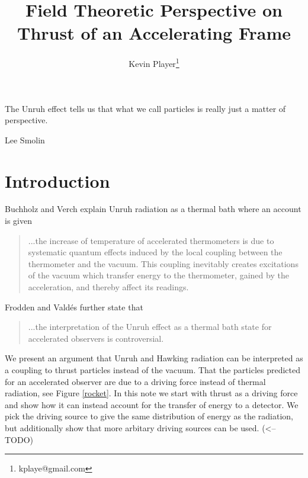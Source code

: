 \documentclass[12pt,a4paper]{article}
\begin{document}
\title{Field Theoretic Perspective on Thrust of an Accelerating Frame}
\author[1]{Kevin Player\footnote{kplaye@gmail.com}}

\maketitle

\epigraph{The Unruh effect tells us that what we call particles is really just a matter of perspective.}{Lee Smolin}


\section{Introduction}
Buchholz and Verch \cite{Buchholz_2016} explain Unruh radiation as a thermal bath where an account is given

\begin{quote}
  ...the increase of temperature of accelerated thermometers is due to systematic quantum effects induced by the local coupling between the thermometer and the vacuum. This coupling inevitably creates excitations of the vacuum which transfer energy to the thermometer, gained by the acceleration, and thereby affect its readings.
\end{quote}
Frodden and Vald{\'{e}}s \cite{Frodden} further state that 
\begin{quote}
...the interpretation of the Unruh effect as a thermal bath state for accelerated observers is controversial.  
\end{quote}
We present an argument that Unruh and Hawking radiation can be interpreted as a coupling to thrust particles instead of the vacuum. That the particles predicted for an accelerated observer are due to a driving force instead of thermal radiation, see Figure \ref{rocket}. In this note we start with thrust as a driving force and show how it can instead account for the transfer of energy to a detector.  We pick the driving source to give the same distribution of energy as the radiation, but additionally show that more arbitary driving sources can be used. (<-- TODO)
\end{document}
